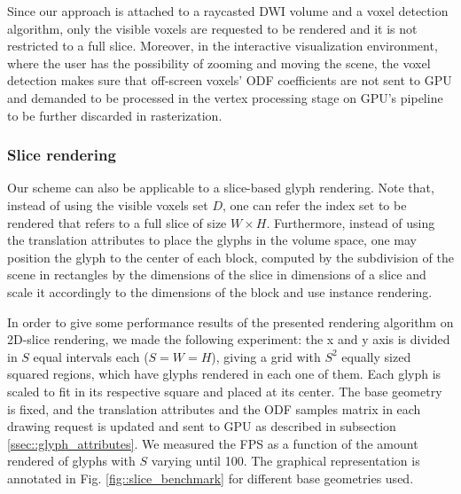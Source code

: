\documentclass[twoside,twocolumn,10pt]{article}
\begin{document}


Since our approach is attached to a raycasted DWI volume and a voxel detection algorithm, only the visible voxels are requested to be rendered and it is not restricted to a full slice. Moreover, in the interactive visualization environment, where the user has the possibility of zooming and moving the scene, the voxel detection makes sure that off-screen voxels' ODF coefficients are not sent to GPU and demanded to be processed in the vertex processing stage on GPU's pipeline to be further discarded in rasterization.

\subsubsection{Slice rendering}

Our scheme can also be applicable to a slice-based glyph rendering. Note that, instead of using the visible voxels set $D$, one can refer the index set to be rendered that refers to a full slice of size $W \times H$. Furthermore, instead of using the translation attributes to place the glyphs in the volume space, one may position the glyph to the center of each block, computed by the subdivision of the scene in rectangles by the dimensions of the slice in dimensions of a slice and scale it accordingly to the dimensions of the block and use instance rendering.

In order to give some performance results of the presented rendering algorithm on 2D-slice rendering, we made the following experiment: the x and y axis is divided in $S$ equal intervals each ($S = W = H$), giving a grid with $S^2$ equally sized squared regions, which have glyphs rendered in each one of them. Each glyph is scaled to fit in its respective square and placed at its center. The base geometry is fixed, and the translation attributes and the ODF samples matrix in each drawing request is updated and sent to GPU as described in subsection \ref{ssec::glyph_attributes}. We measured the FPS as a function of the amount rendered of glyphs with $S$ varying until 100. The graphical representation is annotated in Fig. \ref{fig::slice_benchmark} for different base geometries used.
\end{document}
